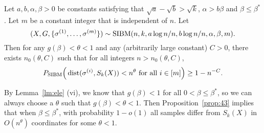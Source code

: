 \documentclass{article}
\begin{document}
\begin{proposition} \label{prop:43}
Let $a,b,\alpha,\beta> 0$ be constants satisfying that $\sqrt{a}-\sqrt{b} > \sqrt{k}$, $\alpha>b\beta$ and $\beta\le\beta^\ast$. Let $m$ be a constant integer that is independent of $n$.
Let 
$$
(X,G,\{\sigma^{(1)},\dots,\sigma^{(m)}\})\sim \operatorname{SIBM}(n,k, a\log n/n, b\log n/n,\alpha,\beta, m) .
$$
Then for any $g(\beta) < \theta < 1$ and any (arbitrarily large constant) $C>0$, there exists $n_0(\theta, C)$ such that for all integers $n>n_0(\theta, C)$,
$$
P_{\operatorname{SIBM}} \Big(\operatorname{dist}(\sigma^{(i)},S_k(X))<n^{\theta}
\text{~for all~} i\in[m] \Big) \ge 1- n^{-C} .
$$
\end{proposition}

By Lemma~\ref{lm:ele} (vi), we know that $g(\beta)<1$ for all $0<\beta\le\beta^\ast$, so we can always choose a $\theta$ such that $g(\beta)<\theta<1$.
Then Proposition~\ref{prop:43} implies that when $\beta\le\beta^\ast$,
with probability $1-o(1)$ all samples differ from $S_k(X)$ in $O(n^\theta)$ coordinates for some $\theta<1$.
\end{document}
